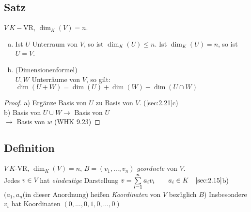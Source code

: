 \subsection{Satz}\label{sec:\thesubsection}
$V\ K-$VR, $\dim_K(V) = n$.\\
\begin{enumerate}[a)]
\item Ist $U$ Unterraum von $V$, so ist $\dim_K(U) \leq n$. Ist $\dim_K(U) = n$, so ist $U = V$.
\item (Dimensionenformel)\\
$U,W$ Unterräume von $V$, so gilt:\\
$\dim(U+W) = \dim(U) + \dim(W) - \dim(U \cap W)$
\end{enumerate}
\begin{proof}
a) Ergänze Basis von $U$ zu Basis von $V$. (\ref{sec:2.21}c)\\
b) Basis von $U \cup W\to$ Basis von $U$\\
\phantom{b) Basis von $U \cup W$} $\to$ Basis von $w$ (WHK 9.23)
\end{proof}
\subsection{Definition}\label{sec:\thesubsection}
$V\ K$-VR, $\dim_K(V) = n,\, B = (v_1,\ldots,v_n)$ \emph{geordnete} von $V$.\\
Jedes $v \in V$ hat \emph{eindeutige} Darstellung $v = \sum\limits_{i=1}^{n} a_iv_i\qquad a_i \in K\quad \ref{sec:2.15}$b)\\
$(a_1,a_n $(in dieser Anordnung) hei\ss en \emph{Koordinaten} von $V$ bezüglich $B$)
Insbesondere $v_i$ hat Koordinaten $(0,\ldots,0,1,0,\ldots,0)$
